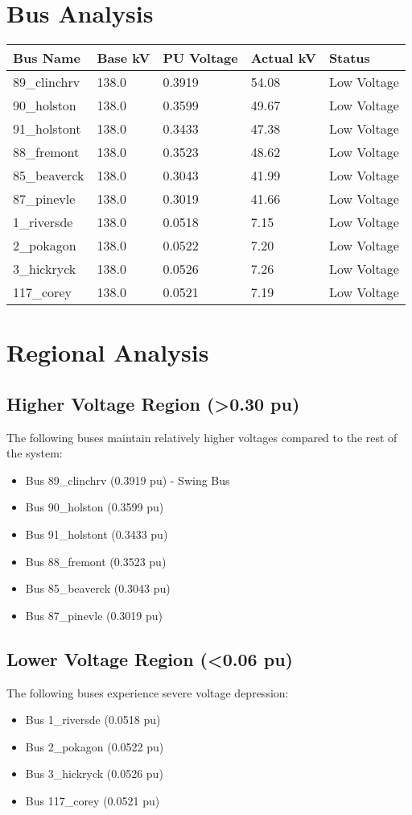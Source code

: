 \documentclass[11pt]{article}
\begin{document}
\section{Bus Analysis}
\begin{longtable}{p{3cm}p{2cm}p{2cm}p{2cm}p{4cm}}
\toprule
Bus Name & Base kV & PU Voltage & Actual kV & Status \\
\midrule
\endhead
89\_clinchrv & 138.0 & 0.3919 & 54.08 & Low Voltage \\
90\_holston & 138.0 & 0.3599 & 49.67 & Low Voltage \\
91\_holstont & 138.0 & 0.3433 & 47.38 & Low Voltage \\
88\_fremont & 138.0 & 0.3523 & 48.62 & Low Voltage \\
85\_beaverck & 138.0 & 0.3043 & 41.99 & Low Voltage \\
87\_pinevle & 138.0 & 0.3019 & 41.66 & Low Voltage \\
1\_riversde & 138.0 & 0.0518 & 7.15 & Low Voltage \\
2\_pokagon & 138.0 & 0.0522 & 7.20 & Low Voltage \\
3\_hickryck & 138.0 & 0.0526 & 7.26 & Low Voltage \\
117\_corey & 138.0 & 0.0521 & 7.19 & Low Voltage \\
\bottomrule
\end{longtable}

\section{Regional Analysis}
\subsection{Higher Voltage Region (>0.30 pu)}
The following buses maintain relatively higher voltages compared to the rest of the system:
\begin{itemize}
    \item Bus 89\_clinchrv (0.3919 pu) - Swing Bus
    \item Bus 90\_holston (0.3599 pu)
    \item Bus 91\_holstont (0.3433 pu)
    \item Bus 88\_fremont (0.3523 pu)
    \item Bus 85\_beaverck (0.3043 pu)
    \item Bus 87\_pinevle (0.3019 pu)
\end{itemize}

\subsection{Lower Voltage Region (<0.06 pu)}
The following buses experience severe voltage depression:
\begin{itemize}
    \item Bus 1\_riversde (0.0518 pu)
    \item Bus 2\_pokagon (0.0522 pu)
    \item Bus 3\_hickryck (0.0526 pu)
    \item Bus 117\_corey (0.0521 pu)
\end{itemize}
\end{document}
